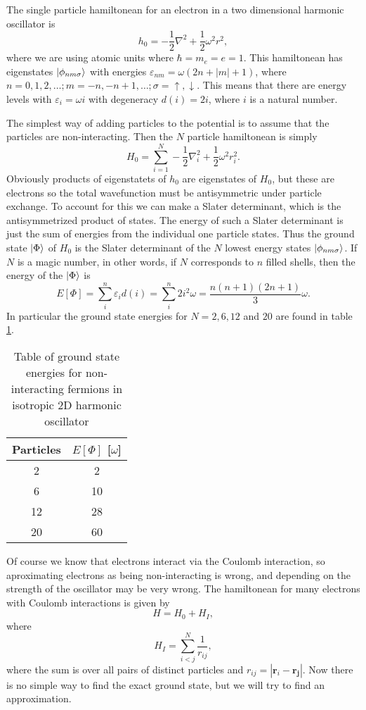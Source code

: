 \documentclass[a4paper,english,12pt]{article}
\newcommand{\bb}[1]{\boldsymbol{#1}}
\newcommand{\be}{\begin{equation}}
\newcommand{\ee}{\end{equation}}
\newcommand{\f}{\frac}
\renewcommand{\epsilon}{\varepsilon}
\begin{document}
The single particle hamiltonean for an electron in a two dimensional harmonic oscillator is
\[
h_0 = -\f{1}{2}\nabla^2 + \f{1}{2}\omega^2 r^2,
\]
where we are using atomic units where $\hbar = m_e = e = 1$.
This hamiltonean has eigenstates
\(\ket{\phi_{nm\sigma}}\) with energies \(\epsilon_{nm} = \omega(2n+|m|+1)\), where $n = 0,1,2,\ldots; m = -n,-n+1,\ldots; \sigma = \uparrow,\downarrow$.\cite{mortenslides}
This means that there are energy levels with \(\epsilon_i = \omega i\) with degeneracy \(d(i) = 2 i\), where $i$ is a natural number.


The simplest way of adding particles to the potential is to assume that the particles are non-interacting. Then the $N$ particle hamiltonean is simply
\be
H_0 = \sum_{i=1}^N -\f{1}{2}\nabla_i^2 + \f{1}{2}\omega^2 r_i^2.
\ee
Obviously products of eigenstatets of $h_0$ are eigenstates of $H_0$, but these are electrons so the total wavefunction must be antisymmetric under particle exchange.
To account for this we can make a Slater determinant, which is the antisymmetrized product of states. The energy of such a Slater determinant is just the sum of energies from the
individual one particle states. Thus the ground state $\Ket{\Phi}$ of $H_0$ is the Slater determinant of the $N$ lowest energy states $\ket{\phi_{nm\sigma}}$. If $N$ is a magic number, in other words, if $N$ corresponds to $n$ filled shells, then the energy of the $\Ket{\Phi}$ is
\be\label{eqH0}
E[\Phi] = \sum_i^n\epsilon_id(i) = \sum_i^n2i^2\omega = \f{n(n+1)(2n+1)}{3}\omega.
\ee
In particular the ground state energies for $N = 2,6,12$ and $20$ are found in table \ref{tab0}.


\begin{table}
  \caption{Table of ground state energies for non-interacting fermions in isotropic 2D harmonic oscillator}\label{tab0}
  \begin{center}
    \begin{tabular}{*{2}{c}}
      Particles &  $E[\Phi]$ [$\omega$] \\
      \hline
      2&2\\
      6&10\\
      12&28\\
      20&60\\
    \end{tabular}
  \end{center}
\end{table}



Of course we know that electrons interact via the Coulomb interaction, so aproximating electrons as being non-interacting is wrong,
and depending on the strength of the oscillator may be very wrong.
The hamiltonean for many electrons with Coulomb interactions is given by
\be
H = H_0 + H_I,
\ee
where
\be\label{eqHi}
H_I = \sum_{i<j}^N\f{1}{r_{ij}},
\ee
where the sum is over all pairs of distinct particles and $r_{ij} = |\bb{r}_i-\bb{r_j}|$.
Now there is no simple way to find the exact ground state, but we will try to find an approximation.
\end{document}
